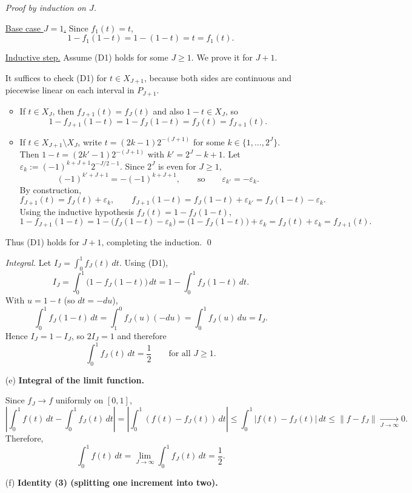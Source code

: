 \documentclass{article}
\begin{document}
\begin{enumerate}
\medskip
\noindent\emph{Proof by induction on $J$.}

\underline{Base case $J=1$.} Since $f_1(t)=t$,
\[
1-f_1(1-t)=1-(1-t)=t=f_1(t).
\]

\underline{Inductive step.} Assume (D1) holds for some $J\ge 1$. We prove it for $J+1$.

It suffices to check (D1) for $t\in X_{J+1}$, because both sides are continuous and piecewise linear on each interval in $P_{J+1}$.

\begin{itemize}
\item If $t\in X_J$, then $f_{J+1}(t)=f_J(t)$ and also $1-t\in X_J$, so
\[
1-f_{J+1}(1-t)=1-f_J(1-t)=f_J(t)=f_{J+1}(t).
\]
\item If $t\in X_{J+1}\setminus X_J$, write $t=(2k-1)2^{-(J+1)}$ for some $k\in\{1,\dots,2^J\}$.
Then $1-t=(2k'-1)2^{-(J+1)}$ with $k'=2^J-k+1$.
Let $\varepsilon_k:=(-1)^{k+J+1}2^{-J/2-1}$. Since $2^J$ is even for $J\ge 1$,
\[
(-1)^{k'+J+1}=-(-1)^{k+J+1},
\qquad\text{so}\qquad
\varepsilon_{k'}=-\varepsilon_k.
\]
By construction,
\[
f_{J+1}(t)=f_J(t)+\varepsilon_k,
\qquad
f_{J+1}(1-t)=f_J(1-t)+\varepsilon_{k'}=f_J(1-t)-\varepsilon_k.
\]
Using the inductive hypothesis $f_J(t)=1-f_J(1-t)$,
\[
1-f_{J+1}(1-t)
=1-\bigl(f_J(1-t)-\varepsilon_k\bigr)
=\bigl(1-f_J(1-t)\bigr)+\varepsilon_k
=f_J(t)+\varepsilon_k
=f_{J+1}(t).
\]
\end{itemize}
Thus (D1) holds for $J+1$, completing the induction. \qed

\medskip
\noindent\emph{Integral.} Let $I_J=\int_0^1 f_J(t)\,dt$. Using (D1),
\[
I_J=\int_0^1 \bigl(1-f_J(1-t)\bigr)\,dt
=1-\int_0^1 f_J(1-t)\,dt.
\]
With $u=1-t$ (so $dt=-du$),
\[
\int_0^1 f_J(1-t)\,dt=\int_1^0 f_J(u)(-du)=\int_0^1 f_J(u)\,du=I_J.
\]
Hence $I_J=1-I_J$, so $2I_J=1$ and therefore
\[
\boxed{\ \int_0^1 f_J(t)\,dt=\frac12\qquad\text{for all }J\ge 1.\ }
\]

\item[(e)] \textbf{Integral of the limit function.}

Since $f_J\to f$ uniformly on $[0,1]$,
\[
\left|\int_0^1 f(t)\,dt-\int_0^1 f_J(t)\,dt\right|
=\left|\int_0^1 (f(t)-f_J(t))\,dt\right|
\le \int_0^1 |f(t)-f_J(t)|\,dt
\le \|f-f_J\|\xrightarrow[J\to\infty]{}0.
\]
Therefore,
\[
\boxed{\ \int_0^1 f(t)\,dt=\lim_{J\to\infty}\int_0^1 f_J(t)\,dt=\frac12.\ }
\]

\item[(f)] \textbf{Identity (3) (splitting one increment into two).}


\end{enumerate}
\end{document}
